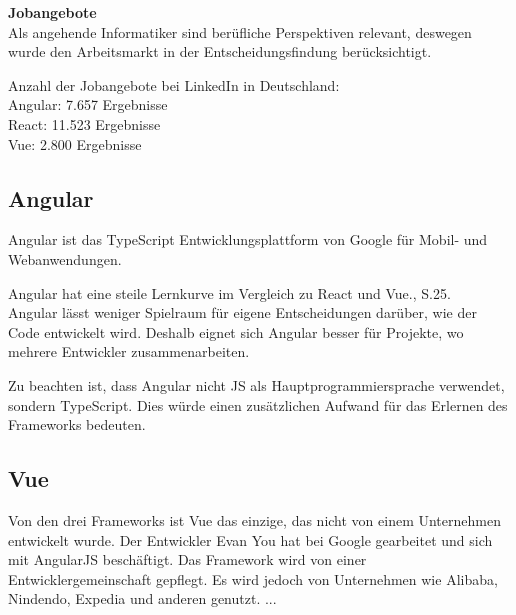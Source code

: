 \textbf{Jobangebote}\\
Als angehende Informatiker sind berüfliche Perspektiven relevant, deswegen wurde den Arbeitsmarkt in der Entscheidungsfindung berücksichtigt.

\begin{flushleft}
Anzahl der Jobangebote bei LinkedIn in Deutschland:
\\
Angular: 7.657 Ergebnisse{\cite{LI3}}
\\
React: 11.523 Ergebnisse{\cite{LI2}}
\\
Vue: 2.800 Ergebnisse{\cite{LI1}}
\end{flushleft}

\subsection{Angular}
Angular ist das TypeScript Entwicklungsplattform von Google für Mobil- und Webanwendungen.


Angular hat eine steile Lernkurve im Vergleich zu React und Vue.{\cite{E01}}, S.25.
\\
Angular lässt weniger Spielraum für eigene Entscheidungen darüber, wie der Code entwickelt wird. Deshalb eignet sich Angular besser für Projekte, wo mehrere Entwickler zusammenarbeiten. 


Zu beachten ist, dass Angular nicht JS als Hauptprogrammiersprache verwendet, sondern TypeScript. Dies würde einen zusätzlichen Aufwand für das Erlernen des Frameworks bedeuten.


\subsection{Vue}
Von den drei Frameworks ist Vue das einzige, das nicht von einem Unternehmen entwickelt wurde. Der Entwickler Evan You hat bei Google gearbeitet und sich mit AngularJS beschäftigt. Das Framework wird von einer Entwicklergemeinschaft gepflegt. Es wird jedoch von Unternehmen wie Alibaba, Nindendo, Expedia und anderen genutzt.
...



